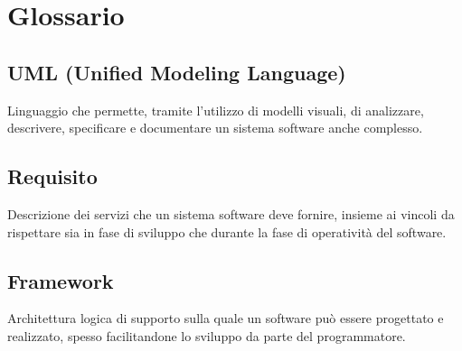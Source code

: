 \cleardoublepage
\chapter{Glossario}

\nocite{*}

\section*{UML (Unified Modeling Language)}
\label{cap:uml-definition}
Linguaggio che permette, tramite l'utilizzo di modelli visuali, di analizzare, descrivere, specificare e documentare un sistema software anche complesso.

\section*{Requisito}
\label{cap:requisito-definition}
Descrizione dei servizi che un sistema software deve fornire, insieme ai vincoli da rispettare sia in fase di sviluppo che durante la fase di operatività del software.

\section*{Framework}
\label{cap:framework-definition}
Architettura logica di supporto sulla quale un software può essere progettato e realizzato, spesso facilitandone lo sviluppo da parte del programmatore.

